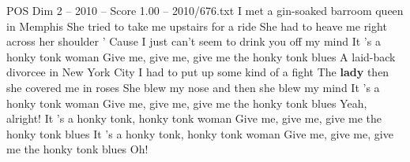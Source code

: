 \begin{textsample}{POS Dim 2 – 2010 – Score 1.00 – 2010/676.txt}  \label{ex:f2_pos_037}
I met a gin-soaked barroom queen in Memphis She tried to take me upstairs for a ride She had to heave me right across her shoulder ' Cause I just can't seem to drink you off my mind It 's a honky tonk woman Give me, give me, give me the honky tonk blues A laid-back divorcee in New York City I had to put up some kind of a fight The \textbf{lady} then she covered me in roses She blew my nose and then she blew my mind It 's a honky tonk woman Give me, give me, give me the honky tonk blues Yeah, alright!
It 's a honky tonk, honky tonk woman Give me, give me, give me the honky tonk blues It 's a honky tonk, honky tonk woman Give me, give me, give me the honky tonk blues Oh!

\end{textsample}
